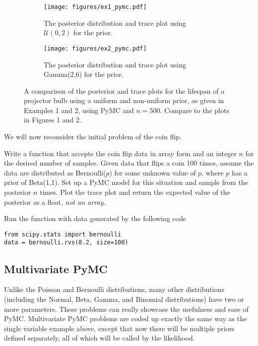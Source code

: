 \begin{figure}[H]
\centering

\begin{subfigure}{\textwidth}
    \centering
    \texttt{[image: figures/ex1\_pymc.pdf]}
    \caption{The posterior distribution and trace plot using $\mathcal{U}(0,2)$ for the prior.}
\end{subfigure}

\begin{subfigure}{\textwidth}
    \centering
    \texttt{[image: figures/ex2\_pymc.pdf]}
    \caption{The posterior distribution and trace plot using Gamma(2,6) for the prior.}
\end{subfigure}

\caption{A comparison of the posterior and trace plots for the lifespan of a projector bulb using a uniform and non-uniform prior, as given in Examples 1 and 2, using PyMC and $n=500$.
Compare to the plots in Figures 1 and 2.}
\end{figure}

We will now reconsider the initial problem of the coin flip. 

\begin{problem}
Write a function that accepts the coin flip data in array form and an integer $n$ for the desired number of samples.
Given data that flips a coin 100 times, assume the data are distributed as Bernoulli($p$) for some unknown value of $p$, where $p$ has a prior of Beta(1,1).
Set up a PyMC model for this situation and sample from the posterior $n$ times.
Plot the trace plot and return the expected value of the posterior as a float, \emph{not an array}.

Run the function with data generated by the following code 
\begin{lstlisting}
from scipy.stats import bernoulli 
data = bernoulli.rvs(0.2, size=100)
\end{lstlisting}
\end{problem} 

\subsection*{Multivariate PyMC}
Unlike the Poisson and Bernoulli distributions, many other distributions (including the Normal, Beta, Gamma, and Binomial distributions) have two or more parameters.
These problems can really showcase the usefulness and ease of PyMC.
Multivariate PyMC problems are coded up exactly the same way as the single variable example above, except that now there will be multiple priors defined separately, all of which will be called by the likelihood.

